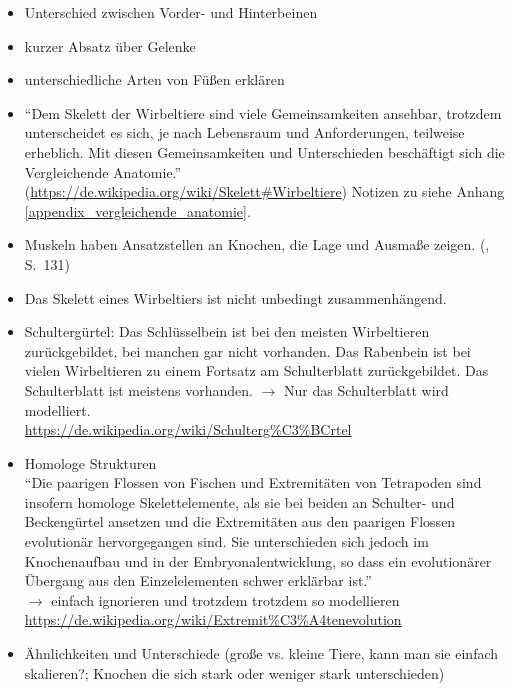 \begin{itemize}
  \item Unterschied zwischen Vorder- und Hinterbeinen
  \item kurzer Absatz über Gelenke
  \item unterschiedliche Arten von Füßen erklären

  \item "`Dem Skelett der Wirbeltiere sind viele Gemeinsamkeiten ansehbar, trotzdem unterscheidet es sich, je nach Lebensraum und Anforderungen, teilweise erheblich. Mit diesen Gemeinsamkeiten und Unterschieden beschäftigt sich die Vergleichende Anatomie."' (\url{https://de.wikipedia.org/wiki/Skelett#Wirbeltiere}) Notizen zu \cite{Vergleichende_Anatomie} siehe Anhang \ref{appendix_vergleichende_anatomie}.

 \item Muskeln haben Ansatzstellen an Knochen, die Lage und Ausmaße zeigen. (\cite{Vergleichende_Anatomie}, S.\ 131)
 \item Das Skelett eines Wirbeltiers ist nicht unbedingt zusammenhängend.

 \item Schultergürtel: Das Schlüsselbein ist bei den meisten Wirbeltieren zurückgebildet, bei manchen gar nicht vorhanden. Das Rabenbein ist bei vielen Wirbeltieren zu einem Fortsatz am Schulterblatt zurückgebildet. Das Schulterblatt ist meistens vorhanden. $\rightarrow$ Nur das Schulterblatt wird modelliert.\\
 \url{https://de.wikipedia.org/wiki/Schulterg\%C3\%BCrtel}
 
 \item Homologe Strukturen \\
 "`Die paarigen Flossen von Fischen und Extremitäten von Tetrapoden sind insofern homologe Skelettelemente, als sie bei beiden an Schulter- und Beckengürtel ansetzen und die Extremitäten aus den paarigen Flossen evolutionär hervorgegangen sind.\cite{homology} %
 Sie unterschieden sich jedoch im Knochenaufbau und in der Embryonalentwicklung, so dass ein evolutionärer Übergang aus den Einzelelementen schwer erklärbar ist."'\\
 $\rightarrow$ einfach ignorieren und trotzdem trotzdem so modellieren\\
 \url{https://de.wikipedia.org/wiki/Extremit\%C3\%A4tenevolution}
 
  \item Ähnlichkeiten und Unterschiede (\zb große vs. kleine Tiere, kann man sie einfach skalieren?; Knochen die sich stark oder weniger stark unterschieden)
\end{itemize}

